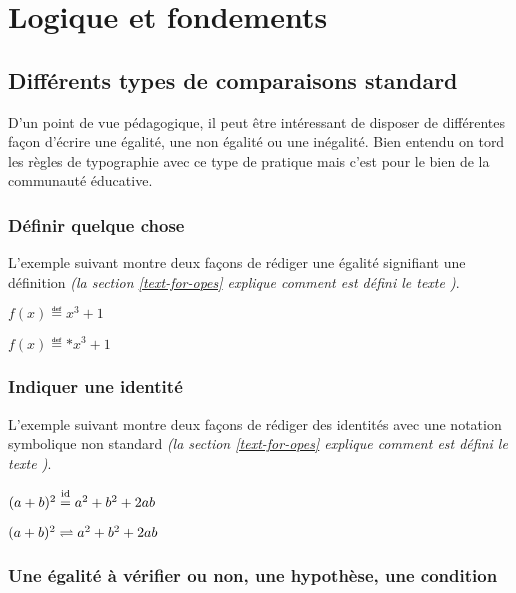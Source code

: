 \documentclass[12pt,a4paper]{article}
\begin{document}
\section{Logique et fondements}

\subsection{Différents types de comparaisons \og standard \fg}

D'un point de vue pédagogique, il peut être intéressant de disposer de différentes façon d'écrire une égalité, une non égalité ou une inégalité.
Bien entendu on tord les règles de typographie avec ce type de pratique mais c'est pour le bien de la communauté éducative.


\subsubsection{Définir quelque chose}

L'exemple suivant montre deux façons de rédiger une égalité signifiant une définition \emph{(la section \ref{text-for-opes} explique comment est défini le texte \emph{\og \textopdef \fg})}.

\begin{latexex}
$f(x) \eqdef x^3 + 1$

$f(x) \eqdef* x^3 + 1$
\end{latexex}




\subsubsection{Indiquer une identité}

L'exemple suivant montre deux façons de rédiger des identités avec une notation symbolique non standard \emph{(la section \ref{text-for-opes} explique comment est défini le texte \emph{\og \textopid \fg})}.

\begin{latexex}
$(a + b)^2 \eqid a^2 + b^2 + 2 a b$

$(a + b)^2 \eqid* a^2 + b^2 + 2 a b$
\end{latexex}




\subsubsection{Une égalité à vérifier ou non, une hypothèse, une condition}
\end{document}
